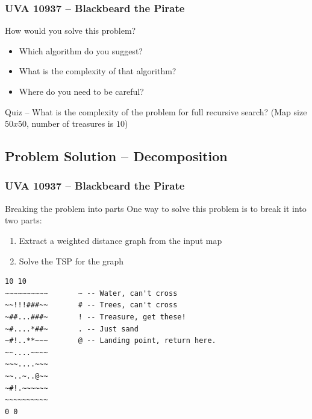 \documentclass{beamer}
\begin{document}
\begin{frame}
  \frametitle{UVA 10937 -- Blackbeard the Pirate}

  How would you solve this problem?

  \vfill

  \begin{itemize}
  \item Which algorithm do you suggest?
    \bigskip

  \item What is the complexity of that algorithm?

    \bigskip
  \item Where do you need to be careful?
  \end{itemize}

  \bigskip

  \alert{Quiz} -- What is the complexity of the problem for full
  recursive search? (Map size $50x50$, number of treasures is $10$)

\end{frame}

\subsection{Problem Solution -- Decomposition}
\begin{frame}[fragile]
  \frametitle{UVA 10937 -- Blackbeard the Pirate}

  {\smaller

    \begin{block}{Breaking the problem into parts}
      One way to solve this problem is to break it into two parts:
      \begin{enumerate}
      \item Extract a weighted distance graph from the input map
      \item Solve the TSP for the graph
      \end{enumerate}
    \end{block}

\begin{verbatim}
10 10
~~~~~~~~~~       ~ -- Water, can't cross
~~!!!###~~       # -- Trees, can't cross
~##...###~       ! -- Treasure, get these!
~#....*##~       . -- Just sand
~#!..**~~~       @ -- Landing point, return here.
~~....~~~~
~~~....~~~
~~..~..@~~
~#!.~~~~~~
~~~~~~~~~~
0 0
\end{verbatim}
  }
\end{frame}
\end{document}
